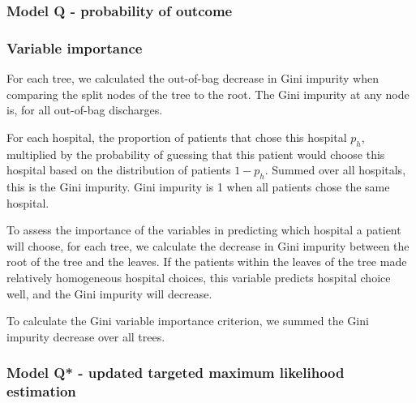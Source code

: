 \documentclass[]{article}
\begin{document}

\subsubsection{Model Q - probability of outcome}


\subsubsection{Variable importance}
For each tree, we calculated the out-of-bag decrease in Gini impurity when comparing the split nodes of the tree to the root. 
The Gini impurity at any node is, for all out-of-bag discharges.

For each hospital, the proportion of patients that chose this hospital $p_h$, multiplied by the probability of guessing that this patient would choose this hospital based on the distribution of patients $1-p_h$. Summed over all hospitals, this is the Gini impurity. Gini impurity is 1 when all patients chose the same hospital.

To assess the importance of the variables in predicting which hospital a patient will choose, for each tree, we calculate the decrease in Gini impurity between the root of the tree and the leaves. If the patients within the leaves of the tree made relatively homogeneous hospital choices, this variable predicts hospital choice well, and the Gini impurity will decrease.
 
To calculate the Gini variable importance criterion, we summed the Gini impurity decrease over all trees.


\subsubsection{Model Q* - updated targeted maximum likelihood estimation}

\end{document}

